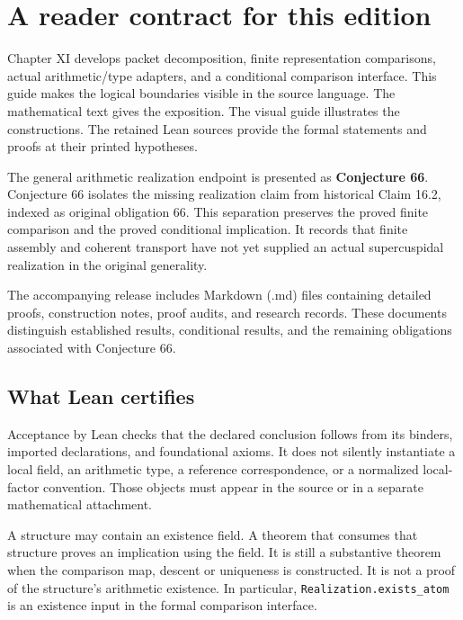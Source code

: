 \documentclass[10pt,oneside]{book}
\begin{document}
\KomorebiCover
{}
\frontmatter

\tableofcontents\mainmatter
\chapter{A reader contract for this edition}
Chapter XI develops packet decomposition, finite representation comparisons, actual arithmetic/type adapters, and a conditional comparison interface. This guide makes the logical boundaries visible in the source language. The mathematical text gives the exposition. The visual guide illustrates the constructions. The retained Lean sources provide the formal statements and proofs at their printed hypotheses.

The general arithmetic realization endpoint is presented as \textbf{Conjecture 66}. Conjecture 66 isolates the missing realization claim from historical Claim 16.2, indexed as original obligation 66. This separation preserves the proved finite comparison and the proved conditional implication. It records that finite assembly and coherent transport have not yet supplied an actual supercuspidal realization in the original generality.

The accompanying release includes Markdown (.md) files containing detailed proofs, construction notes, proof audits, and research records. These documents distinguish established results, conditional results, and the remaining obligations associated with Conjecture 66.

\section{What Lean certifies}
Acceptance by Lean checks that the declared conclusion follows from its binders, imported declarations, and foundational axioms. It does not silently instantiate a local field, an arithmetic type, a reference correspondence, or a normalized local-factor convention. Those objects must appear in the source or in a separate mathematical attachment.

A structure may contain an existence field. A theorem that consumes that structure proves an implication using the field. It is still a substantive theorem when the comparison map, descent or uniqueness is constructed. It is not a proof of the structure's arithmetic existence. In particular, \texttt{Realization.exists\_atom} is an existence input in the formal comparison interface.
\end{document}
